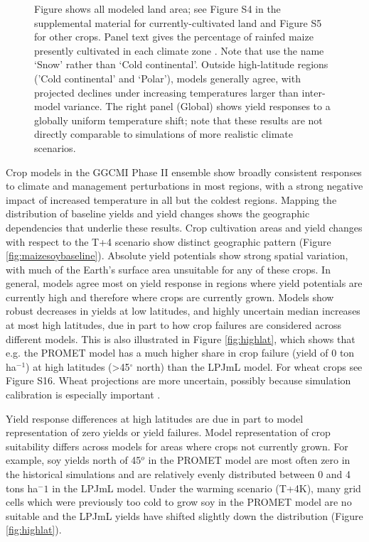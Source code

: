 \documentclass[gmd, manuscript]{copernicus} %
\begin{document}
\begin{figure}[ht]
{	Figure shows all modeled land area; see Figure S4 in the supplemental material for currently-cultivated land and Figure S5 for other crops. Panel text gives the percentage of rainfed maize presently cultivated in each climate zone \citep[data from][]{Portmann2010}. 
	Note that \citet{rubel2010} use the name `Snow' rather than `Cold continental'. 
	Outside high-latitude regions ('Cold continental' and `Polar'), models generally agree, with projected declines under increasing temperatures larger than inter-model variance. 
	The right panel (Global) shows yield responses to a globally uniform temperature shift; note that these results are not directly comparable to simulations of more realistic climate scenarios.}
   \label{fig:globesim}
\end{figure}

Crop models in the GGCMI Phase II ensemble show broadly consistent responses to climate and management perturbations in most regions, with a strong negative impact of increased temperature in all but the coldest regions. 
Mapping the distribution of baseline yields and yield changes shows the geographic dependencies that underlie these results. Crop cultivation areas and yield changes with respect to the T+4 scenario show distinct geographic pattern (Figure \ref{fig:maizesoybaseline}). 
Absolute yield potentials show strong spatial variation, with much of the Earth's surface area unsuitable for any of these crops. 
In general, models agree most on yield response in regions where yield potentials are currently high and therefore where crops are currently grown. 
Models show robust decreases in yields at low latitudes, and highly uncertain median increases at most high latitudes, due in part to how crop failures are considered across different models. 
This is also illustrated in Figure \ref{fig:highlat}, which shows that e.g. the PROMET model has a much higher share in crop failure (yield of 0 ton ha$^{-1}$) at high latitudes (>45$^\circ$ north) than the LPJmL model.
For wheat crops see Figure S16.
Wheat projections are more uncertain, possibly because simulation calibration is especially important \citep[e.g.][]{Asseng2013}.

Yield response differences at high latitudes are due in part to model representation of zero yields or yield failures. Model representation of crop suitability differs across models for areas where crops not currently grown. For example, soy yields north of 45$^o$ in the PROMET model are most often zero in the historical simulations and are relatively evenly distributed between 0 and 4 tons ha$^-1$ in the LPJmL model. Under the warming scenario (T+4K), many grid cells which were previously too cold to grow soy in the PROMET model are no suitable and the LPJmL yields have shifted slightly down the distribution (Figure \ref{fig:highlat}).
\end{document}
